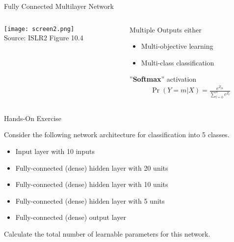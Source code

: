 \documentclass[ignorenonframetext,xcolor=x11names]{beamer}
\begin{document}
\begin{frame}{Fully Connected Multilayer Network}
\begin{columns}
\begin{column}{.66\textwidth}
\centering
\texttt{[image: screen2.png]} \\

\scriptsize Source: ISLR2 Figure 10.4
\end{column}
\begin{column}{.33\textwidth}
Multiple Outputs either
\begin{itemize}
   \item Multi-objective learning
   \item Multi-class classification
\end{itemize}
\vspace{\baselineskip}

''\textbf{Softmax}'' activation
\begin{align*}
\Pr(Y=m|X) = \frac{e^{Z_m}}{\sum_{l=0}^n e^{Z_l}}
\end{align*}
\end{column}
\end{columns}
\end{frame}

\begin{frame}{Hands-On Exercise}

Consider the following network architecture for classification into 5 classes.

\begin{itemize}
   \item Input layer with 10 inputs
   \item Fully-connected (dense) hidden layer with 20 units
   \item Fully-connected (dense) hidden layer with 10 units
   \item Fully-connected (dense) hidden layer with 5 units
   \item Fully-connected (dense) output layer
\end{itemize}

Calculate the total number of learnable parameters for this network.
\end{frame}
\end{document}
